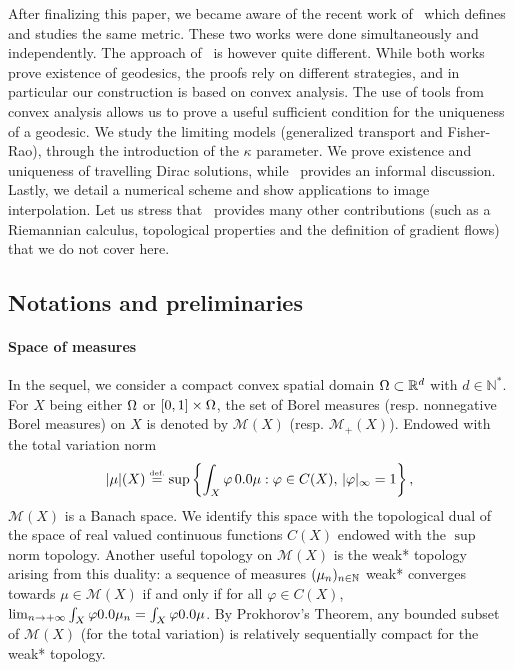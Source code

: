 After finalizing this paper, we became aware of the recent work of~\cite{new2015kondratyev} which defines and studies the same metric.  These two works were done simultaneously and independently.  The approach of~\cite{new2015kondratyev} is however quite different.
%
While both works prove existence of geodesics, the proofs rely on different strategies, and in particular our construction is based on convex analysis.
%
The use of tools from convex analysis allows us to prove a useful sufficient condition for the uniqueness of a geodesic.
% 
We study the limiting models (generalized transport and Fisher-Rao), through the introduction of the $\kappa$ parameter. 
% 
We prove existence and uniqueness of travelling Dirac solutions, while~\cite{new2015kondratyev} provides an informal discussion. 
% 
Lastly, we detail a numerical scheme and show applications to image interpolation. 
% 
Let us stress that~\cite{new2015kondratyev} provides many other contributions (such as a Riemannian calculus, topological properties and the definition of gradient flows) that we do not cover here. 



\subsection{Notations and preliminaries}

\paragraph{Space of measures}
In the sequel, we consider a compact convex spatial domain $\Omega \subset \mathbb{R}^d$ with $d \in \mathbb{N}^*$. For $X$ being either $\Omega$ or $[0,1]\times \Omega$, the set of Borel measures (resp. nonnegative Borel measures) on $X$ is denoted by $\mathcal{M}(X)$ (resp. $\mathcal{M}_+(X)$). Endowed with the total variation norm
\[
|\mu|(X) \defeq \sup \left\{ \int_{X} \varphi\, \d \mu : \varphi \in C(X),\, \vert \varphi \vert_{\infty} =1 \right\} ,
\]
$\mathcal{M}(X)$ is a Banach space. We identify this space with the topological dual of the space of real valued continuous functions $C(X)$ endowed with the $\sup$ norm topology. Another useful topology on $\mathcal{M}(X)$ is the weak* topology arising from this duality: a sequence of measures $(\mu_n)_{n\in \mathbb{N}}$ weak* converges towards $\mu \in \mathcal{M}(X)$ if and only if for all $\varphi \in C(X)$, $\lim_{n\rightarrow + \infty}\int_{X} \varphi \d\mu_n = \int_{X} \varphi \d\mu$. By Prokhorov's Theorem, any bounded subset of $\mathcal{M}(X)$ (for the total variation) is relatively sequentially compact for the weak* topology.

